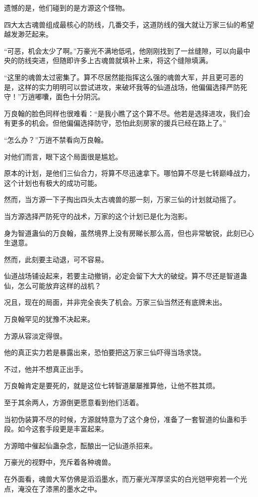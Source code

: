 \begin{this_body}
遗憾的是，他们碰到的是方源这个怪物。

四大太古魂兽组成最核心的防线，几番交手，这道防线的强大就让万家三仙的希望越发渺茫起来。

“可恶，机会太少了啊。”万豪光不满地低吼，他刚刚找到了一丝缝隙，可以向最中央的防线突进，但随即许多上古魂兽就填补上来，将这个缝隙填满。

“这里的魂兽太过密集了。算不尽居然能指挥这么强的魂兽大军，并且更可恶的是，这样的实力明明可以尝试进攻，来破坏我等的仙道战场，他偏偏选择严防死守！”万逍嘟囔，面色十分阴沉。

万良翰的脸色同样也很难看：“是我小瞧了这个算不尽。他若是选择进攻，我们会有更多的机会。但他偏偏选择防守，恐怕此刻房家的援兵已经在路上了。”

“怎么办？”万逍不禁看向万良翰。

对他们而言，眼下这个局面很是尴尬。

原本的计划，是他们三仙合力，将算不尽迅速拿下。哪怕算不尽是七转巅峰战力，这个计划也有极大的成功可能。

然而，当方源一下子掏出四头太古魂兽的那一刻，万家三仙的计划就动摇了。

当方源选择严防死守的战术，万家的这个计划已是化为泡影。

身为智道蛊仙的万良翰，虽然境界上没有房睇长那么高，但也非常敏锐，此刻已心生退意。

然而，此刻要主动退，可不容易。

仙道战场铺设起来，若要主动撤销，必定会留下大大的破绽。算不尽还是智道蛊仙，怎么可能放弃这样的战机？

况且，现在的局面，并非完全丧失了机会。万家三仙当然还有底牌未出。

万良翰罕见的犹豫不决起来。

方源从容淡定得很。

他的真正实力若是暴露出来，恐怕要把这万家三仙吓得当场求饶。

不过，他并不想真正出手。

万良翰肯定是要死的，就是这位七转智道屡屡推算他，让他不胜其烦。

至于其余两人，方源倒更愿意看到他们活着。

当初伪装算不尽的时候，方源就特意为了这个身份，准备了一套智道的仙蛊和手段。如今这套手段更是丰富起来。

方源暗中催起仙蛊杂念，酝酿出一记仙道杀招来。

万豪光的视野中，充斥着各种魂兽。

在外面看，魂兽大军仿佛是滔滔墨水，而万豪光浑厚坚实的白光铠甲宛若一个光点，淹没在了漆黑的墨水之中。


\end{this_body}
